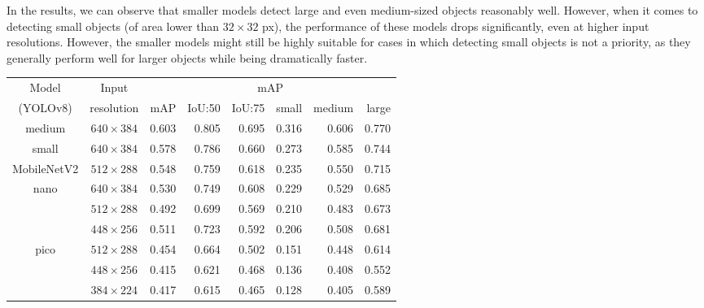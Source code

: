 In the results, we can observe that smaller models detect large and even
medium-sized objects reasonably well. However, when it comes to detecting small
objects (of area lower than $32 \times 32$ px), the performance of these models
drops significantly, even at higher input resolutions. However, the smaller
models might still be highly suitable for cases in which detecting small objects
is not a priority, as they generally perform well for larger objects while being
dramatically faster.

\begin{table}
    \centering
    \small
    \begin{tabular}{|c|c|rrrrrr|}
        \hline
        Model & Input & \multicolumn{6}{c|}{mAP} \\
        \cline{3-8}
        (YOLOv8)                     & resolution                       & mAP   & IoU:50& IoU:75& small & medium& large \\
        \hline
        \hline
        \multirow{1}{*}{medium}      & \multirow{1}{*}{$640\times384$}  & 0.603 & 0.805 & 0.695 & 0.316 & 0.606 & 0.770 \\
        \hline                                                          
        \multirow{1}{*}{small}       & \multirow{1}{*}{$640\times384$}  & 0.578 & 0.786 & 0.660 & 0.273 & 0.585 & 0.744 \\
        \hline
        \multirow{1}{*}{MobileNetV2} & \multirow{1}{*}{$512\times288$}  & 0.548 & 0.759 & 0.618 & 0.235 & 0.550 & 0.715 \\
        \hline                      
        \multirow{3}{*}{nano}        & \multirow{1}{*}{$640\times384$}  & 0.530 & 0.749 & 0.608 & 0.229 & 0.529 & 0.685 \\
        \cline{2-2}
                                     & \multirow{1}{*}{$512\times288$}  & 0.492 & 0.699 & 0.569 & 0.210 & 0.483 & 0.673 \\
        \cline{2-2}
                                     & \multirow{1}{*}{$448\times256$}  & 0.511 & 0.723 & 0.592 & 0.206 & 0.508 & 0.681 \\
        \hline
        \multirow{3}{*}{pico}        & \multirow{1}{*}{$512\times288$}  & 0.454 & 0.664 & 0.502 & 0.151 & 0.448 & 0.614 \\
        \cline{2-2}
                                     & \multirow{1}{*}{$448\times256$}  & 0.415 & 0.621 & 0.468 & 0.136 & 0.408 & 0.552 \\
        \cline{2-2}
                                     & \multirow{1}{*}{$384\times224$}  & 0.417 & 0.615 & 0.465 & 0.128 & 0.405 & 0.589 \\

\end{tabular}
\end{table}

